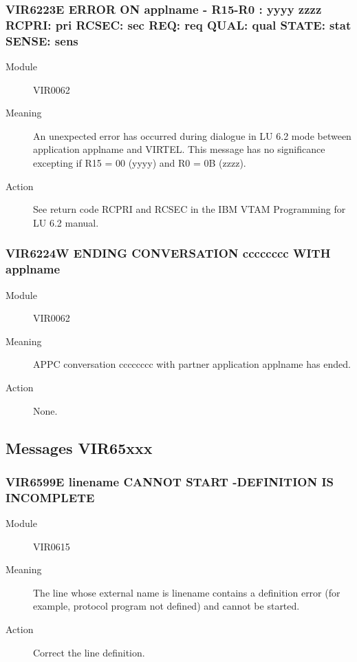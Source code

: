 \documentclass[letterpaper,10pt,english]{sphinxmanual}
\begin{document}
\subsubsection{VIR6223E ERROR ON applname - R15-R0 : yyyy zzzz RCPRI: pri RCSEC: sec REQ: req QUAL: qual STATE: stat SENSE: sens}
\label{\detokenize{messages:vir6223e-error-on-applname-r15-r0-yyyy-zzzz-rcpri-pri-rcsec-sec-req-req-qual-qual-state-stat-sense-sens}}\begin{description}
\item[{Module}] \leavevmode
VIR0062

\item[{Meaning}] \leavevmode
An unexpected error has occurred during dialogue in LU 6.2 mode between application applname and VIRTEL. This message has no significance excepting if R15 = 00 (yyyy) and R0 = 0B (zzzz).

\item[{Action}] \leavevmode
See return code RCPRI and RCSEC in the IBM VTAM Programming for LU 6.2 manual.

\end{description}


\subsubsection{VIR6224W ENDING CONVERSATION cccccccc WITH applname}
\label{\detokenize{messages:vir6224w-ending-conversation-cccccccc-with-applname}}\begin{description}
\item[{Module}] \leavevmode
VIR0062

\item[{Meaning}] \leavevmode
APPC conversation cccccccc with partner application applname has ended.

\item[{Action}] \leavevmode
None.

\end{description}


\subsection{Messages VIR65xxx}
\label{\detokenize{messages:messages-vir65xxx}}

\subsubsection{VIR6599E linename CANNOT START -DEFINITION IS INCOMPLETE}
\label{\detokenize{messages:vir6599e-linename-cannot-start-definition-is-incomplete}}\begin{description}
\item[{Module}] \leavevmode
VIR0615

\item[{Meaning}] \leavevmode
The line whose external name is linename contains a definition error (for example, protocol program not defined) and cannot be started.

\item[{Action}] \leavevmode
Correct the line definition.

\end{description}
\end{document}
